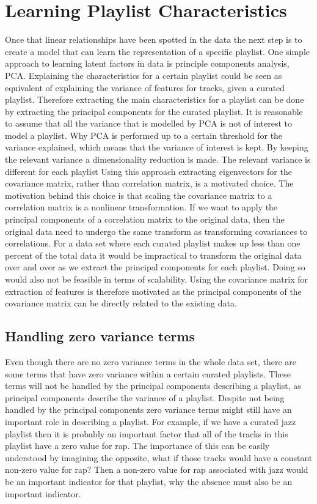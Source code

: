 \documentclass[a4paper,11pt]{kth-mag}
\begin{document}
\section{Learning Playlist Characteristics}
Once that linear relationships have been spotted in the data the next step is to create a model that can learn the representation of a specific playlist. One simple approach to learning latent factors in data is principle components analysis, PCA.
Explaining the characteristics for a certain playlist could be seen as equivalent of explaining the variance of features for tracks, given a curated playlist. Therefore extracting the main characteristics for a playlist can be done by extracting the principal components for the curated playlist. It is reasonable to assume that all the variance that is modelled by PCA is not of interest to model a playlist. Why PCA is performed up to a certain threshold for the variance explained, which means that the variance of interest is kept. By keeping the relevant variance a dimensionality reduction is made. The relevant variance is different for each playlist
Using this approach extracting eigenvectors for the covariance matrix, rather than correlation matrix, is a motivated choice. The motivation behind this choice is that scaling the covariance matrix to a correlation matrix is a nonlinear transformation. If we want to apply the principal components of a correlation matrix to the original data, then the original data need to undergo the same transform as transforming covariances to correlations. For a data set where each curated playlist makes up less than one percent of the total data it would be impractical to transform the original data over and over as we extract the principal components for each playlist. Doing so would also not be feasible in terms of scalability. Using the covariance matrix for extraction of features is therefore motivated as the principal components of the covariance matrix can be directly related to the existing data.

\subsection{Handling zero variance terms}
Even though there are no zero variance terms in the whole data set, there are some terms that have zero variance within a certain curated playlists. These terms will not be handled by the principal components describing a playlist, as principal components describe the variance of a playlist. Despite not being handled by the principal components zero variance terms might still have an important role in describing a playlist. For example, if we have a curated jazz playlist then it is probably an important factor that all of the tracks in this playlist have a zero value for rap. The importance of this can be easily understood by imagining the opposite, what if those tracks would have a constant non-zero value for rap? Then a non-zero value for rap associated with jazz would be an important indicator for that playlist, why the absence must also be an important indicator.
\end{document}
